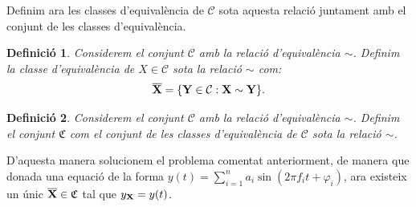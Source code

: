 \documentclass{article}
\theoremstyle{math}
\newtheorem{definition}{Definició}[section]
\newcommand{\0}{\ensuremath{\vb{0}}}
\newcommand{\X}{\ensuremath{\vb{X}}}
\newcommand{\Y}{\ensuremath{\vb{Y}}}
\begin{document}
Definim ara les classes d'equivalència de $\mathcal{C}$ sota aquesta relació juntament amb el conjunt de les classes d'equivalència.
\begin{definition}
    Considerem el conjunt $\mathcal{C}$ amb la relació d'equivalència $\sim$. Definim la classe d'equivalència de $X\in\mathcal{C}$ sota la relació $\sim$ com: $$\overline{\X}=\{\Y\in\mathcal{C}:\X\sim \Y\}.$$
\end{definition}
\begin{definition}
    Considerem el conjunt $\mathcal{C}$ amb la relació d'equivalència $\sim$. Definim el conjunt $\mathfrak{C}$ com el conjunt de les classes d'equivalència de $\mathcal{C}$ sota la relació $\sim$.
\end{definition}
D'aquesta manera solucionem el problema comentat anteriorment, de manera que donada una equació de la forma $y(t)=\sum_{i=1}^na_i\sin(2\pi f_it+\varphi_i)$, ara existeix un únic $\overline{\X}\in\mathfrak{C}$ tal que $y_{\X}=y(t)$.
\end{document}
